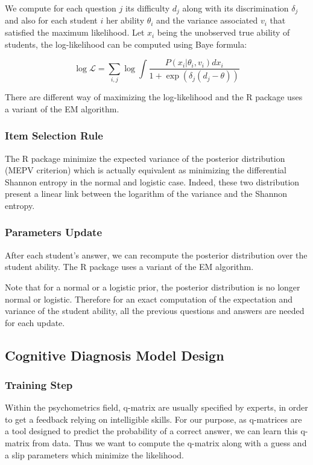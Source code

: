 \documentclass{sig-alternate}
\begin{document}
We compute for each question $j$ its difficulty $d_j$ along with its discrimination $\delta_j$ and also for each student $i$ her ability $\theta_i$ and the variance associated $v_i$ that satisfied the maximum likelihood. Let $x_i$ being the unobserved true ability of students, the log-likelihood can be computed using Baye formula: 

\[\log \mathcal{L} = \sum_{i,j} \log \int \frac{P(x_i | \theta_i, v_i)dx_i}{1+\exp(\delta_j (d_j - \theta))}\]

There are different way of maximizing the log-likelihood and the R package uses a variant of the EM algorithm. 

\subsubsection{Item Selection Rule}

The R package minimize the expected variance of the posterior distribution (MEPV criterion) which is actually equivalent as minimizing the differential Shannon entropy in the normal and logistic case. Indeed, these two distribution present a linear link between the logarithm of the variance and the Shannon entropy.  %

\subsubsection{Parameters Update}

After each student's answer, we can recompute the posterior distribution over the student ability. The R package uses a variant of the EM algorithm. 

Note that for a normal or a logistic prior, the posterior distribution is no longer normal or logistic. Therefore for an exact computation of the expectation and variance of the student ability, all the previous questions and answers are needed for each update. 

\subsection{Cognitive Diagnosis Model Design}

\subsubsection{Training Step}

Within the psychometrics field, q-matrix are usually specified by experts, in order to get a feedback relying on intelligible skills. For our purpose, as q-matrices are a tool designed to predict the probability of a correct answer, we can learn this q-matrix from data. Thus we want to compute the q-matrix along with a guess and a slip parameters which minimize the likelihood.
\end{document}
